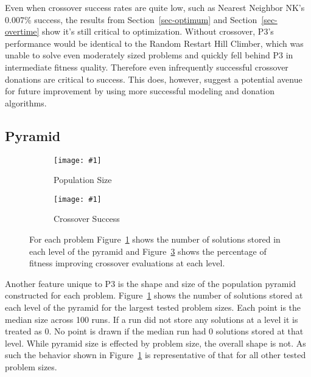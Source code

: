 \documentclass[twoside]{article}
\newcommand{\includegraphicsfit}[1]
{\texttt{[image: \#1]}}
\begin{document}
Even when crossover success rates are quite low, such as Nearest Neighbor NK's 0.007\% success,
the results from Section~\ref{sec-optimum} and Section~\ref{sec-overtime} show it's still critical to optimization. Without
crossover, P3's performance would be identical to the Random Restart Hill Climber, which was unable to solve even moderately sized problems
and quickly fell behind P3 in intermediate fitness quality. Therefore even infrequently successful crossover donations are
critical to success. This does, however, suggest a potential avenue for future improvement by using more successful
modeling and donation algorithms.

\subsection{Pyramid}
\begin{figure}[t]
  \begin{centering}
    \begin{subfigure}{.5\textwidth}
      \begin{centering}
        \includegraphicsfit{level-size}
      \end{centering}
      \caption{Population Size}
      \label{fig-level-size}
    \end{subfigure}%
    \begin{subfigure}{.5\textwidth}
      \begin{centering}
        \includegraphicsfit{level-success}
      \end{centering}
      \caption{Crossover Success}
      \label{fig-level-success}
    \end{subfigure}
  \end{centering}
  \caption{For each problem Figure~\ref{fig-level-size} shows the number of solutions stored in each level of the pyramid
           and Figure~\ref{fig-level-success} shows the percentage of fitness improving crossover evaluations at each level.}
\end{figure}

Another feature unique to P3 is the shape and size of the population pyramid
constructed for each problem. Figure~\ref{fig-level-size} shows the number of solutions stored at
each level of the pyramid for the largest tested problem sizes. Each point is the
median size across 100 runs. If a run did not store any solutions at a level it is treated as 0.
No point is drawn if the median run had 0 solutions stored at that level. While pyramid size
is effected by problem size, the overall shape is not. As such the behavior shown in Figure~\ref{fig-level-size}
is representative of that for all other tested problem sizes.
\end{document}
